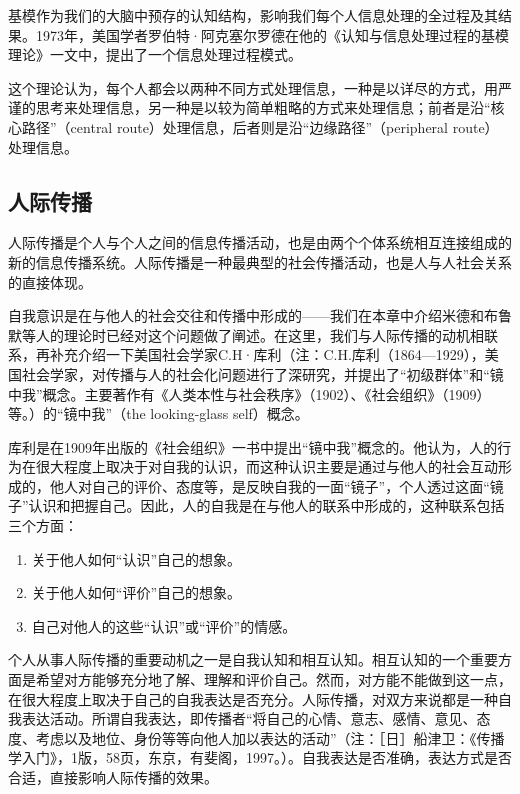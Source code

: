 \documentclass[UTF8,12pt]{ctexart}
\numberwithin{equation}{section} %
\numberwithin{figure}{section}
\numberwithin{table}{section}
\begin{document}
	基模作为我们的大脑中预存的认知结构，影响我们每个人信息处理的全过程及其结果。1973年，美国学者罗伯特·阿克塞尔罗德在他的《认知与信息处理过程的基模理论》一文中，提出了一个信息处理过程模式。
	
	这个理论认为，每个人都会以两种不同方式处理信息，一种是以详尽的方式，用严谨的思考来处理信息，另一种是以较为简单粗略的方式来处理信息；前者是沿“核心路径”（central route）处理信息，后者则是沿“边缘路径”（peripheral route）处理信息。
	
	\subsection{人际传播}
	人际传播是个人与个人之间的信息传播活动，也是由两个个体系统相互连接组成的新的信息传播系统。人际传播是一种最典型的社会传播活动，也是人与人社会关系的直接体现。
	
	自我意识是在与他人的社会交往和传播中形成的——我们在本章中介绍米德和布鲁默等人的理论时已经对这个问题做了阐述。在这里，我们与人际传播的动机相联系，再补充介绍一下美国社会学家C.H·库利（注：C.H.库利（1864—1929），美国社会学家，对传播与人的社会化问题进行了深研究，并提出了“初级群体”和“镜中我”概念。主要著作有《人类本性与社会秩序》（1902）、《社会组织》（1909）等。）的“镜中我”（the looking-glass self）概念。
	
	库利是在1909年出版的《社会组织》一书中提出“镜中我”概念的。他认为，人的行为在很大程度上取决于对自我的认识，而这种认识主要是通过与他人的社会互动形成的，他人对自己的评价、态度等，是反映自我的一面“镜子”，个人透过这面“镜子”认识和把握自己。因此，人的自我是在与他人的联系中形成的，这种联系包括三个方面：
	\begin{enumerate}
		\item 关于他人如何“认识”自己的想象。
		
		\item 关于他人如何“评价”自己的想象。
		
		\item 自己对他人的这些“认识”或“评价”的情感。
	\end{enumerate}
	
	个人从事人际传播的重要动机之一是自我认知和相互认知。相互认知的一个重要方面是希望对方能够充分地了解、理解和评价自己。然而，对方能不能做到这一点，在很大程度上取决于自己的自我表达是否充分。人际传播，对双方来说都是一种自我表达活动。所谓自我表达，即传播者“将自己的心情、意志、感情、意见、态度、考虑以及地位、身份等等向他人加以表达的活动”（注：［日］船津卫：《传播学入门》，1版，58页，东京，有斐阁，1997。）。自我表达是否准确，表达方式是否合适，直接影响人际传播的效果。
	
\end{document}
